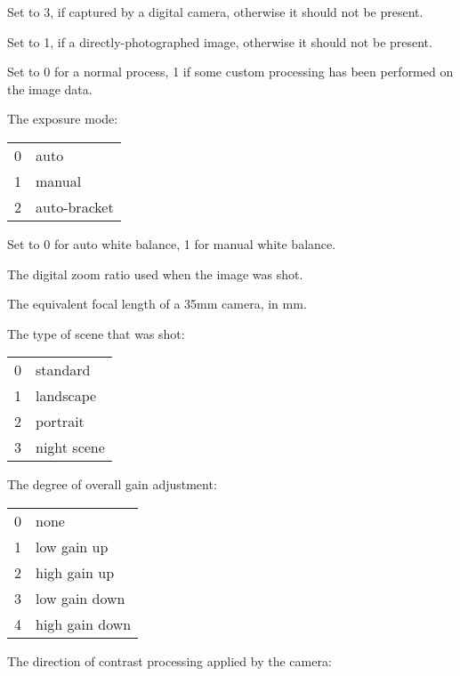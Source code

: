 Set to 3, if captured by a digital camera, otherwise it should not be
present.
\apiend

Set to 1, if a directly-photographed image, otherwise it should not be
present.
\apiend


Set to 0 for a normal process, 1 if some custom processing has been
performed on the image data.
\apiend

The exposure mode:
\medskip

\begin{tabular}{p{0.3in} p{4in}}
0 & auto \\
1 & manual \\
2 & auto-bracket
\end{tabular}
\apiend

Set to 0 for auto white balance, 1 for manual white balance.
\apiend

The digital zoom ratio used when the image was shot.
\apiend

The equivalent focal length of a 35mm camera, in mm.
\apiend

The type of scene that was shot:
\medskip

\begin{tabular}{p{0.3in} p{4in}}
0 & standard \\
1 & landscape \\
2 & portrait \\
3 & night scene
\end{tabular}
\apiend

The degree of overall gain adjustment:
\medskip

\begin{tabular}{p{0.3in} p{4in}}
0 & none \\
1 & low gain up \\
2 & high gain up \\
3 & low gain down \\
4 & high gain down
\end{tabular}
\apiend

The direction of contrast processing applied by the camera:
\medskip

